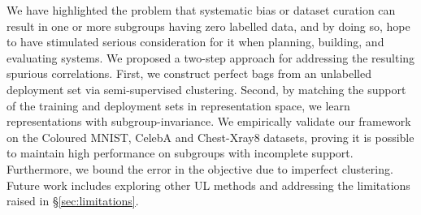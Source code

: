 %
We have highlighted the problem that systematic bias or dataset curation can result in one or more
subgroups having zero labelled data, and by doing so, hope to have stimulated serious consideration
for it when planning, building, and evaluating systems.
%
We proposed a two-step approach for addressing the resulting spurious correlations.
%
First, we construct perfect bags from an unlabelled deployment set via semi-supervised clustering. 
%
Second, by matching the support of the training and deployment sets in representation space, we
learn representations with subgroup-invariance.
%
We empirically validate our frame\-work on the Coloured MNIST, CelebA and Chest-Xray8 datasets,
proving it is possible to maintain high performance on subgroups with incomplete support.
%
Furthermore, we bound the error in the objective due to imperfect clustering.
%
Future work includes exploring other \ac{UL} methods and addressing the limitations raised in
\S\ref{sec:limitations}.

